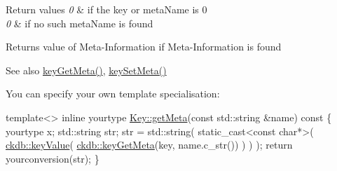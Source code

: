 \begin{DoxyRetVals}{Return values}
{\em 0} & if the key or meta\+Name is 0 \\
\hline
{\em 0} & if no such meta\+Name is found \\
\hline
\end{DoxyRetVals}
\begin{DoxyReturn}{Returns}
value of Meta-\/\+Information if Meta-\/\+Information is found 
\end{DoxyReturn}
\begin{DoxySeeAlso}{See also}
\hyperlink{group__keymeta_ga9ed3875495ddb3d8a8d29158a60a147c}{key\+Get\+Meta()}, \hyperlink{group__keymeta_gae1f15546b234ffb6007d8a31178652b9}{key\+Set\+Meta()}
\end{DoxySeeAlso}
You can specify your own template specialisation\+: 
\begin{DoxyCode}
\textcolor{keyword}{template}<>
\textcolor{keyword}{inline} yourtype \hyperlink{classkdb_1_1Key_a36e21abc1a5b8c3a8d3ee39f8f8b91fa}{Key::getMeta}(\textcolor{keyword}{const} std::string &name)\textcolor{keyword}{ const}
\textcolor{keyword}{}\{
        yourtype x;
        std::string str;
        str = std::string(
                static\_cast<const char*>(
                        \hyperlink{group__keyvalue_ga6f29609c5da53c6dc26a98678d5752af}{ckdb::keyValue}(
                                \hyperlink{group__keymeta_ga9ed3875495ddb3d8a8d29158a60a147c}{ckdb::keyGetMeta}(key, name.c\_str())
                                )
                        )
                );
        \textcolor{keywordflow}{return} yourconversion(str);
\}
\end{DoxyCode}



